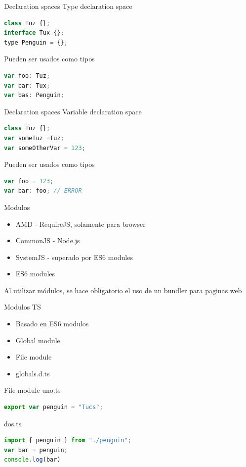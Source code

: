 \documentclass[aspectratio=169]{beamer}
\begin{document}
\begin{frame}[fragile]{Declaration spaces}
Type declaration space
\begin{lstlisting}[language=JavaScript,basicstyle=\scriptsize]
class Tuz {};
interface Tux {};
type Penguin = {};
\end{lstlisting}
Pueden ser usados como tipos
\begin{lstlisting}[language=JavaScript,basicstyle=\scriptsize]
var foo: Tuz;
var bar: Tux;
var bas: Penguin;
\end{lstlisting}
\end{frame}

\begin{frame}[fragile]{Declaration spaces}
Variable declaration space
\begin{lstlisting}[language=JavaScript,basicstyle=\scriptsize]
class Tuz {};
var someTuz =Tuz;
var someOtherVar = 123;
\end{lstlisting}
Pueden ser usados como tipos
\begin{lstlisting}[language=JavaScript,basicstyle=\scriptsize]
var foo = 123;
var bar: foo; // ERROR
\end{lstlisting}
\end{frame}

\begin{frame}[fragile]{Modulos}
\begin{itemize}
	\item AMD - RequireJS, solamente para browser
	\item CommonJS - Node.js
	\item SystemJS - superado por ES6 modules
	\item ES6 modules
\end{itemize}
Al utilizar módulos, se hace obligatorio el uso de un bundler para paginas web
\end{frame}


\begin{frame}[fragile]{Modulos TS}
\begin{itemize}
	\item Basado en ES6 modulos
	\item Global module
	\item File module
	\item globals.d.ts
\end{itemize}
\end{frame}

\begin{frame}[fragile]{File module}
uno.ts
\begin{lstlisting}[language=JavaScript,basicstyle=\scriptsize]
export var penguin = "Tucs";
\end{lstlisting}
dos.ts
\begin{lstlisting}[language=JavaScript,basicstyle=\scriptsize]
import { penguin } from "./penguin";
var bar = penguin;
console.log(bar)
\end{lstlisting}
\end{frame}
\end{document}
